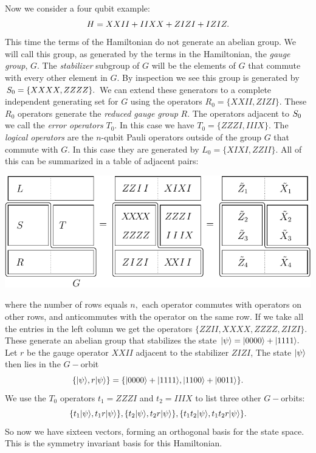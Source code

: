 \documentclass[12pt]{article}
\begin{document}
Now we consider a four qubit example:
$$
    H = XXII + IIXX + ZIZI + IZIZ.
$$
This time the terms of the Hamiltonian do not generate 
an abelian group.
We will call this group, as generated by the terms in the Hamiltonian,
the \emph{gauge group}, $G$.
The \emph{stabilizer} subgroup of $G$ will be the elements of $G$
that commute with every other element in $G.$
By inspection we see this group is generated by $S_0=\{XXXX, ZZZZ\}.$
We can extend these generators to a complete independent generating
set for $G$ using the operators  $R_0=\{XXII, ZIZI\}.$
These $R_0$ operators generate the \emph{reduced gauge group} $R.$
The operators adjacent to $S_0$ we
call the \emph{error operators} $T_0$. 
In this case we have $T_0 = \{ZZZI, IIIX\}.$
The \emph{logical operators} are the $n$-qubit 
Pauli operators outside of the group
$G$ that commute with $G.$
In this case they are generated by $L_0 = \{XIXI, ZZII\}.$
All of this can be summarized in a table of adjacent pairs:
\begin{center}
\includegraphics[]{pic-gauge4.pdf}
\end{center}
where the number of rows equals $n,$ 
each operator commutes with operators on other rows,
and anticommutes with the operator on the same row. 
If we take all the entries in the left column
we get the operators 
$\{ ZZII, XXXX, ZZZZ, ZIZI \}.$ 
These generate an abelian group 
that stabilizes the
state $|{\psi}\rangle = |{0000}\rangle+|{1111}\rangle.$
Let $r$ be the gauge operator $XXII$ adjacent to the 
stabilizer $ZIZI$,
The state $|{\psi}\rangle$ then lies in the $G-$orbit 
$$
\{|{\psi}\rangle, r|{\psi}\rangle\} = \{|{0000}\rangle+|{1111}\rangle, |{1100}\rangle+|{0011}\rangle\}.
$$
We use the $T_0$ operators $t_1=ZZZI$ and $t_2=IIIX$
to list three other $G-$orbits:
$$
\{t_1 |{\psi}\rangle, t_1 r|{\psi}\rangle\}, 
\{t_2 |{\psi}\rangle, t_2 r|{\psi}\rangle\}, 
\{t_1 t_2 |{\psi}\rangle, t_1 t_2 r|{\psi}\rangle\}.
$$
So now we have sixteen vectors, forming an orthogonal basis for the state space.
This is the symmetry invariant basis for this Hamiltonian.
\end{document}
